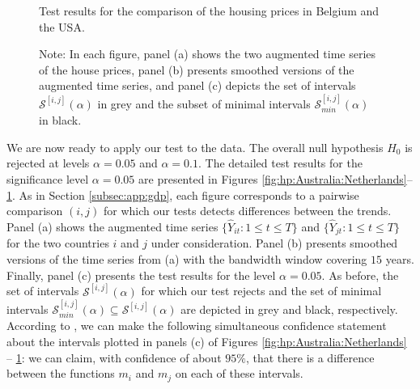 \documentclass[a4paper,12pt]{article}
\makeatletter
\renewcommand{\eqref}[1]{\tagform@{\ref{#1}}}
\makeatother
\begin{document}
\begin{figure}
\begin{minipage}[t]{0.24\textwidth}
\caption{Test results for the comparison of the housing prices in Belgium and the USA.}\label{fig:hp:Belgium:USA}
\end{minipage}
\caption*{Note: In each figure, panel (a) shows the two augmented time series of the house prices, panel (b) presents smoothed versions of the augmented time series, and panel (c) depicts the set of intervals $\mathcal{S}^{[i, j]}(\alpha)$ in grey and the subset of minimal intervals $\mathcal{S}^{[i, j]}_{min}(\alpha)$ in black.}
\end{figure}

We are now ready to apply our test to the data. The overall null hypothesis $H_0$ is rejected at levels $\alpha = 0.05$ and $\alpha = 0.1$. The detailed test results for the significance level $\alpha =0.05$ are presented in Figures \ref{fig:hp:Australia:Netherlands}--\ref{fig:hp:Belgium:USA}. As in Section \ref{subsec:app:gdp}, each figure corresponds to a pairwise comparison $(i, j)$ for which our tests detects differences between the trends. Panel (a) shows the augmented time series $\{\widehat{Y}_{it}: 1 \le t \le T\}$ and $\{\widehat{Y}_{jt}: 1 \le t \le T\}$ for the two countries $i$ and $j$ under consideration. Panel (b) presents smoothed versions of the time series from (a) with the bandwidth window covering $15$ years. Finally, panel (c) presents the test results for the level $\alpha=0.05$. As before, the set of intervals $\mathcal{S}^{[i, j]}(\alpha)$ for which our test rejects and the set of minimal intervals $\mathcal{S}^{[i, j]}_{min}(\alpha) \subseteq \mathcal{S}^{[i, j]}(\alpha)$ are depicted in grey and black, respectively. According to \eqref{eq:CS-v2}, we can make the following simultaneous confidence statement about the intervals plotted in panels (c) of Figures \ref{fig:hp:Australia:Netherlands} -- \ref{fig:hp:Belgium:USA}: we can claim, with confidence of about $95\%$, that there is a difference between the functions $m_i$ and $m_j$ on each of these intervals. 
\end{document}
